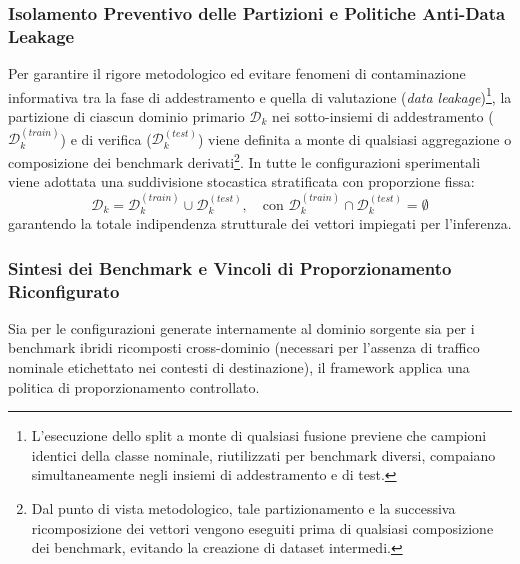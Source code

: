\subsubsection{Isolamento Preventivo delle Partizioni e Politiche Anti-Data Leakage}
\label{subsubsec:isolamento_partizioni}
Per garantire il rigore metodologico ed evitare fenomeni di contaminazione informativa tra la fase di addestramento e quella di valutazione (\textit{data leakage})\footnote{L'esecuzione dello split a monte di qualsiasi fusione previene che campioni identici della classe nominale, riutilizzati per benchmark diversi, compaiano simultaneamente negli insiemi di addestramento e di test.}, la partizione di ciascun dominio primario $\mathcal{D}_k$ nei sotto-insiemi di addestramento ($\mathcal{D}_k^{(train)}$) e di verifica ($\mathcal{D}_k^{(test)}$) viene definita a monte di qualsiasi aggregazione o composizione dei benchmark derivati\footnote{Dal punto di vista metodologico, tale partizionamento e la successiva ricomposizione dei vettori vengono eseguiti prima di qualsiasi composizione dei benchmark, evitando la creazione di dataset intermedi.}. In tutte le configurazioni sperimentali viene adottata una suddivisione stocastica stratificata con proporzione fissa:
\begin{equation}
    \mathcal{D}_k = \mathcal{D}_k^{(train)} \cup \mathcal{D}_k^{(test)}, \quad \text{con } \mathcal{D}_k^{(train)} \cap \mathcal{D}_k^{(test)} = \emptyset
    \label{eq:split_train_test}
\end{equation}
garantendo la totale indipendenza strutturale dei vettori impiegati per l'inferenza.

\subsubsection{Sintesi dei Benchmark e Vincoli di Proporzionamento Riconfigurato}
\label{subsubsec:sintesi_benchmark}
Sia per le configurazioni generate internamente al dominio sorgente sia per i benchmark ibridi ricomposti cross-dominio (necessari per l'assenza di traffico nominale etichettato nei contesti di destinazione), il framework applica una politica di proporzionamento controllato.

